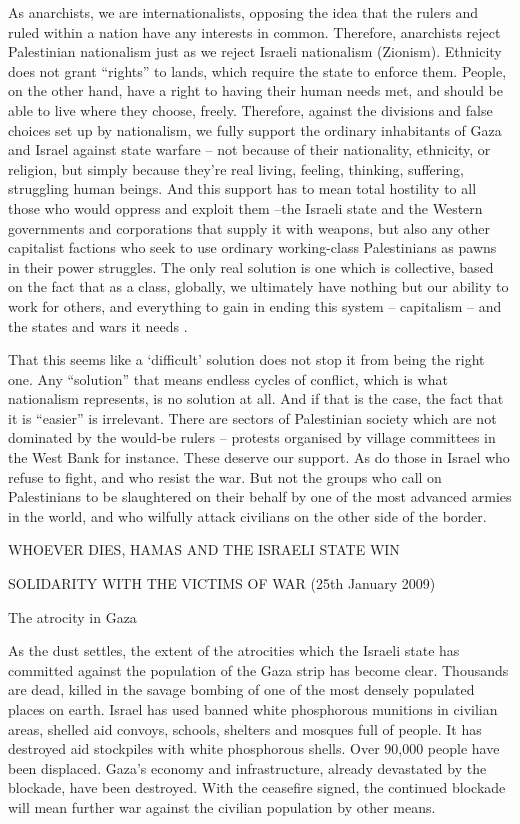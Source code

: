 As anarchists, we are internationalists, opposing the idea that the rulers and ruled within
a nation have any interests in common. Therefore, anarchists reject Palestinian nationalism
just as we reject Israeli nationalism (Zionism). Ethnicity does not grant “rights” to
lands, which require the state to enforce them. People, on the other hand, have a right to
having their human needs met, and should be able to live where they choose, freely.
Therefore, against the divisions and false choices set up by nationalism, we fully support
the ordinary inhabitants of Gaza and Israel against state warfare – not because of
their nationality, ethnicity, or religion, but simply because they’re real living, feeling,
thinking, suffering, struggling human beings. And this support has to mean total hostility
to all those who would oppress and exploit them –the Israeli state and the Western
governments and corporations that supply it with weapons, but also any other capitalist
factions who seek to use ordinary working-class Palestinians as pawns in their power
struggles. The only real solution is one which is collective, based on the fact that as a
class, globally, we ultimately have nothing but our ability to work for others, and everything
to gain in ending this system – capitalism – and the states and wars it needs .

That this seems like a ‘difficult’ solution does not stop it from being the right one. Any
“solution” that means endless cycles of conflict, which is what nationalism represents, is
no solution at all. And if that is the case, the fact that it is “easier” is irrelevant. There are
sectors of Palestinian society which are not dominated by the would-be rulers – protests
organised by village committees in the West Bank for instance. These deserve our support.
As do those in Israel who refuse to fight, and who resist the war. But not the groups
who call on Palestinians to be slaughtered on their behalf by one of the most advanced
armies in the world, and who wilfully attack civilians on the other side of the border.

WHOEVER DIES, HAMAS AND THE ISRAELI STATE WIN

SOLIDARITY WITH THE VICTIMS OF WAR (25th January 2009)

The atrocity in Gaza

As the dust settles, the extent of the atrocities which the Israeli state has committed
against the population of the Gaza strip has become clear. Thousands are dead,
killed in the savage bombing of one of the most densely populated places on earth. Israel
has used banned white phosphorous munitions in civilian areas, shelled aid convoys,
schools, shelters and mosques full of people. It has destroyed aid stockpiles with white
phosphorous shells. Over 90,000 people have been displaced. Gaza’s economy and infrastructure,
already devastated by the blockade, have been destroyed. With the ceasefire
signed, the continued blockade will mean further war against the civilian population by
other means.

